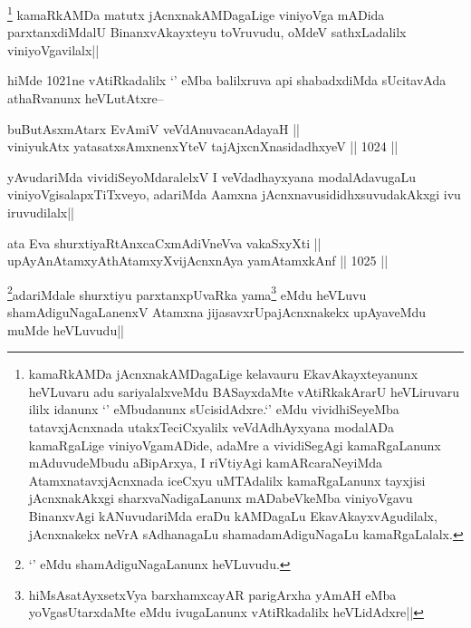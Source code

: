 \begin{artha}
\footnote{kamaRkAMDa jAcnxnakAMDagaLige kelavauru EkavAkayxteyanunx heVLuvaru adu sariyalalxveMdu BASayxdaMte vAtiRkakArarU heVLiruvaru ililx idanunx `\stext' eMbudanunx sUcisidAdxre.`\stext' eMdu vividhiSeyeMba tatavxjAcnxnada utakxTeciCxyalilx veVdAdhAyxyana modalADa kamaRgaLige viniyoVgamADide, adaMre a vividiSegAgi kamaRgaLanunx mAduvudeMbudu aBipArxya, I riVtiyAgi kamARcaraNeyiMda AtamxnatavxjAcnxnada iceCxyu uMTAdalilx kamaRgaLanunx tayxjisi jAcnxnakAkxgi sharxvaNadigaLanunx mADabeVkeMba viniyoVgavu BinanxvAgi kANuvudariMda eraDu kAMDagaLu EkavAkayxvAgudilalx, jAcnxnakekx neVrA sAdhanagaLu shamadamAdiguNagaLu kamaRgaLalalx.} kamaRkAMDa matutx jAcnxnakAMDagaLige viniyoVga mADida parxtanxdiMdalU BinanxvAkayxteyu toVruvudu, oMdeV sathxLadalilx viniyoVgavilalx||
\end{artha}

\begin{artha}
hiMde 1021ne vAtiRkadalilx `\stext' eMba balilxruva api shabadxdiMda sUcitavAda athaRvanunx heVLutAtxre--
\end{artha}

\begin{shl}
buButAsxmAtarx EvAmiV veVdAnuvacanAdayaH || \\
viniyukAtx yatasatxsAmxnenxYteV tajAjxcnXnasidadhxyeV ||  1024 ||  
\end{shl}

\begin{artha}
yAvudariMda vividiSeyoMdaralelxV I veVdadhayxyana modalAdavugaLu viniyoVgisalapxTiTxveyo, adariMda Aamxna jAcnxnavusididhxsuvudakAkxgi ivu iruvudilalx||
\end{artha}

\begin{shl}
ata Eva shurxtiyaRtAnxcaCxmAdiVneVva vakaSxyXti || \\
upAyAnAtamxyAthAtamxyXvijAcnxnAya yamAtamxkAnf ||  1025 ||  
\end{shl}

\begin{artha}
\footnote{`\stext' eMdu shamAdiguNagaLanunx heVLuvudu.}adariMdale shurxtiyu parxtanxpUvaRka yama\footnote{hiMsAsatAyxsetxVya barxhamxcayAR parigArxha yAmAH eMba yoVgasUtarxdaMte eMdu ivugaLanunx vAtiRkadalilx heVLidAdxre||} eMdu heVLuvu shamAdiguNagaLanenxV Atamxna jijasavxrUpajAcnxnakekx upAyaveMdu muMde heVLuvudu||
\end{artha}


